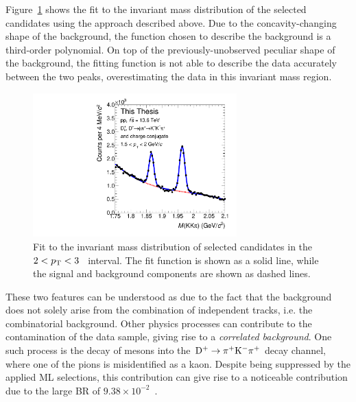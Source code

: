 Figure~\ref{fig:old_fit} shows the fit to the invariant mass distribution of the selected candidates using the approach described above. Due to the concavity-changing shape of the background, the function chosen to describe the background is a third-order polynomial. On top of the previously-unobserved peculiar shape of the background, the fitting function is not able to describe the data accurately between the two peaks, overestimating the data in this invariant mass region.
\begin{figure}[htb]
    \centering
    \includegraphics[width=0.7\textwidth]{Figures/Chapter 5/InvMassFitDs1p5_2.pdf}
    \caption{Fit to the invariant mass distribution of selected candidates in the \mbox{$2<p_\mathrm{T}<3$~\gevc} interval. The fit function is shown as a solid line, while the signal and background components are shown as dashed lines.}
    \label{fig:old_fit}
\end{figure}

These two features can be understood as due to the fact that the background does not solely arise from the combination of independent tracks, i.e. the combinatorial background. Other physics processes can contribute to the contamination of the data sample, giving rise to a \emph{correlated background}. One such process is the decay of \dpl mesons into the $\mathrm{D^+}\rightarrow\mathrm{\pi^+K^-\pi^+}$ decay channel, where one of the pions is misidentified as a kaon. Despite being suppressed by the applied ML selections, this contribution can give rise to a noticeable contribution due to the large BR of $9.38\times10^{-2}$~\cite{pdg}.

